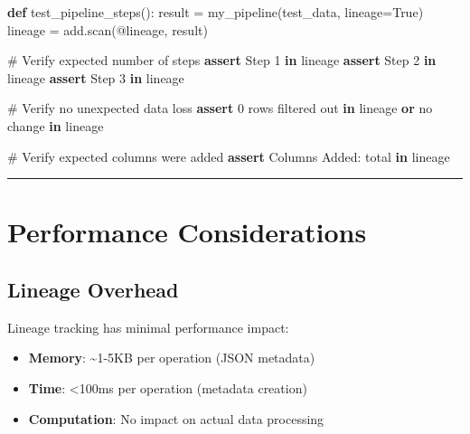 \documentclass[
  letterpaper,
]{scrbook}
\newenvironment{Shaded}{\begin{snugshade}}{\end{snugshade}}
\newcommand{\CommentTok}[1]{\textcolor[rgb]{0.37,0.37,0.37}{#1}}
\newcommand{\ControlFlowTok}[1]{\textcolor[rgb]{0.00,0.23,0.31}{\textbf{#1}}}
\newcommand{\KeywordTok}[1]{\textcolor[rgb]{0.00,0.23,0.31}{\textbf{#1}}}
\newcommand{\NormalTok}[1]{\textcolor[rgb]{0.00,0.23,0.31}{#1}}
\newcommand{\OperatorTok}[1]{\textcolor[rgb]{0.37,0.37,0.37}{#1}}
\newcommand{\StringTok}[1]{\textcolor[rgb]{0.13,0.47,0.30}{#1}}
\newcommand{\VariableTok}[1]{\textcolor[rgb]{0.07,0.07,0.07}{#1}}
\providecommand{\tightlist}{%
  \setlength{\itemsep}{0pt}\setlength{\parskip}{0pt}}
\begin{document}
\begin{Shaded}
\begin{Highlighting}[]
\KeywordTok{def}\NormalTok{ test\_pipeline\_steps():}
\NormalTok{    result }\OperatorTok{=}\NormalTok{ my\_pipeline(test\_data, lineage}\OperatorTok{=}\VariableTok{True}\NormalTok{)}
\NormalTok{    lineage }\OperatorTok{=}\NormalTok{ add.scan(}\StringTok{\textquotesingle{}@lineage\textquotesingle{}}\NormalTok{, result)}
    
    \CommentTok{\# Verify expected number of steps}
    \ControlFlowTok{assert} \StringTok{\textquotesingle{}Step 1\textquotesingle{}} \KeywordTok{in}\NormalTok{ lineage}
    \ControlFlowTok{assert} \StringTok{\textquotesingle{}Step 2\textquotesingle{}} \KeywordTok{in}\NormalTok{ lineage}
    \ControlFlowTok{assert} \StringTok{\textquotesingle{}Step 3\textquotesingle{}} \KeywordTok{in}\NormalTok{ lineage}
    
    \CommentTok{\# Verify no unexpected data loss}
    \ControlFlowTok{assert} \StringTok{\textquotesingle{}0 rows filtered out\textquotesingle{}} \KeywordTok{in}\NormalTok{ lineage }\KeywordTok{or} \StringTok{\textquotesingle{}no change\textquotesingle{}} \KeywordTok{in}\NormalTok{ lineage}
    
    \CommentTok{\# Verify expected columns were added}
    \ControlFlowTok{assert} \StringTok{\textquotesingle{}Columns Added: total\textquotesingle{}} \KeywordTok{in}\NormalTok{ lineage}
\end{Highlighting}
\end{Shaded}

\begin{center}\rule{0.5\linewidth}{0.5pt}\end{center}

\section{Performance Considerations}\label{performance-considerations}

\subsection{Lineage Overhead}\label{lineage-overhead}

Lineage tracking has minimal performance impact:

\begin{itemize}
\tightlist
\item
  \textbf{Memory}: \textasciitilde1-5KB per operation (JSON metadata)
\item
  \textbf{Time}: \textless100ms per operation (metadata creation)
\item
  \textbf{Computation}: No impact on actual data processing
\end{itemize}
\end{document}
